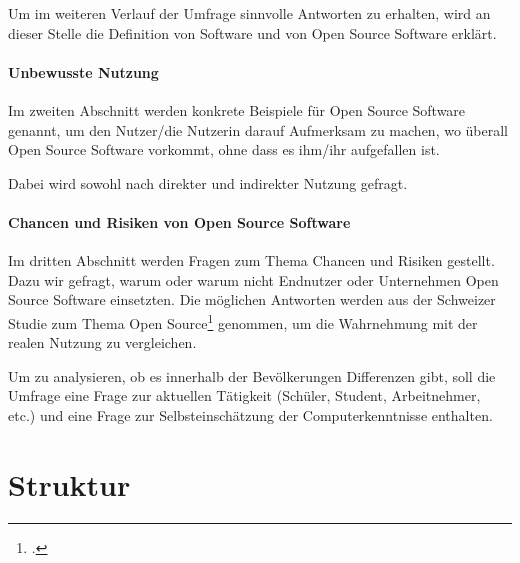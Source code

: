 \documentclass[a4paper]{article}
\begin{document}
	       Um im weiteren Verlauf der Umfrage sinnvolle Antworten zu erhalten, wird an dieser Stelle die Definition von Software und von Open Source Software erklärt.
	 
	   
	   \paragraph{Unbewusste Nutzung}
	       Im zweiten Abschnitt werden konkrete Beispiele für Open Source Software genannt, um den Nutzer/die Nutzerin  darauf Aufmerksam zu machen, wo überall Open Source Software vorkommt, ohne dass es ihm/ihr aufgefallen ist.
	       
	       Dabei wird sowohl nach direkter und indirekter Nutzung gefragt.
	       
	   \paragraph{Chancen und Risiken von Open Source Software}
	       Im dritten Abschnitt werden Fragen zum Thema Chancen und Risiken gestellt. Dazu wir gefragt, warum oder warum nicht Endnutzer oder Unternehmen Open Source Software einsetzten. Die möglichen Antworten werden aus der Schweizer Studie zum Thema Open Source\footcite{oss:studie} genommen, um die Wahrnehmung mit der realen Nutzung zu vergleichen.
	   \\\par
	   Um zu analysieren, ob es innerhalb der Bevölkerungen Differenzen gibt, soll die Umfrage eine Frage zur aktuellen Tätigkeit (Schüler, Student, Arbeitnehmer, etc.) und eine Frage zur Selbsteinschätzung der Computerkenntnisse enthalten.
	   
	   
	\section{Struktur}
	
    
    \clearpage
    \printbibliography
\end{document}
